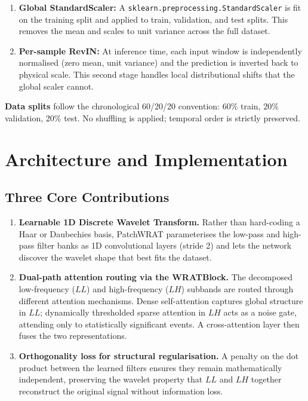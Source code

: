 \documentclass[11pt, letterpaper]{article}
\begin{document}
\begin{enumerate}
  \item \textbf{Global StandardScaler:} A \texttt{sklearn.preprocessing.StandardScaler} is fit on the training split and applied to train, validation, and test splits. This removes the mean and scales to unit variance across the full dataset.
  \item \textbf{Per-sample RevIN:} At inference time, each input window is independently normalised (zero mean, unit variance) and the prediction is inverted back to physical scale. This second stage handles local distributional shifts that the global scaler cannot.
\end{enumerate}

\textbf{Data splits} follow the chronological 60/20/20 convention: 60\% train, 20\% validation, 20\% test. No shuffling is applied; temporal order is strictly preserved.

\section{Architecture and Implementation}

\subsection{Three Core Contributions}

\begin{enumerate}
  \item \textbf{Learnable 1D Discrete Wavelet Transform.} Rather than hard-coding a Haar or Daubechies basis, PatchWRAT parameterises the low-pass and high-pass filter banks as 1D convolutional layers (stride 2) and lets the network discover the wavelet shape that best fits the dataset.

  \item \textbf{Dual-path attention routing via the WRATBlock.} The decomposed low-frequency ($LL$) and high-frequency ($LH$) subbands are routed through different attention mechanisms. Dense self-attention captures global structure in $LL$; dynamically thresholded sparse attention in $LH$ acts as a noise gate, attending only to statistically significant events. A cross-attention layer then fuses the two representations.

  \item \textbf{Orthogonality loss for structural regularisation.} A penalty on the dot product between the learned filters ensures they remain mathematically independent, preserving the wavelet property that $LL$ and $LH$ together reconstruct the original signal without information loss.
\end{enumerate}
\end{document}

